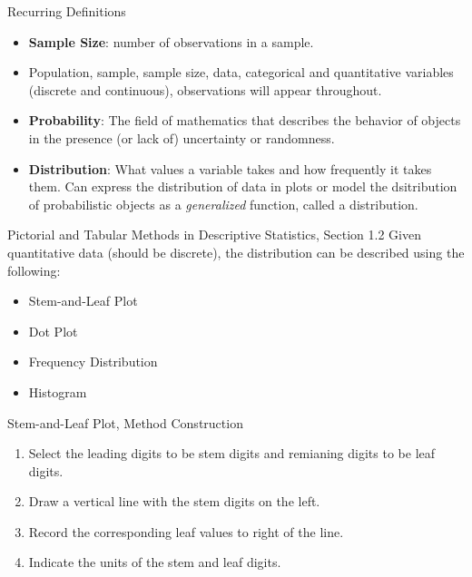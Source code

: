 \documentclass{beamer}
\newcommand{\blue}[1]{{\color{blue} #1}}
\newcommand{\red}[1]{{\color{red} #1}}
\begin{document}
\begin{frame}{Recurring Definitions}
    \begin{itemize}
        \item {\bf Sample Size}: number of observations in a sample.
        \item Population, sample, sample size, data, categorical and quantitative variables (discrete and continuous), observations will appear throughout.
        \item {\bf Probability}: The field of mathematics that describes the behavior of objects in the presence (or lack of) uncertainty or randomness.
        \item {\bf Distribution}:  What values a variable takes and how frequently it takes them. Can express the distribution of  data in plots or model the dsitribution of probabilistic objects as a {\it generalized} function, called a distribution.
    \end{itemize}
\end{frame}

\begin{frame}{Pictorial and Tabular Methods in Descriptive Statistics, Section 1.2}
    Given quantitative data (should be discrete), the distribution can be described using the following:
    \begin{itemize}
        \item Stem-and-Leaf Plot
        \item Dot Plot
        \item Frequency Distribution
        \item Histogram
    \end{itemize}
\end{frame}

\begin{frame}{Stem-and-Leaf Plot, Method}
    Construction
    \begin{enumerate}
        \item Select the \blue{leading} digits to be \blue{stem} digits and \red{remianing} digits to be \red{leaf} digits.
        \item Draw a vertical line with the \blue{stem} digits on the left.
        \item Record the corresponding \red{leaf} values to right of the line.
        \item Indicate the units of the \red{stem} and \blue{leaf} digits.
    \end{enumerate}
\end{frame}
\end{document}
